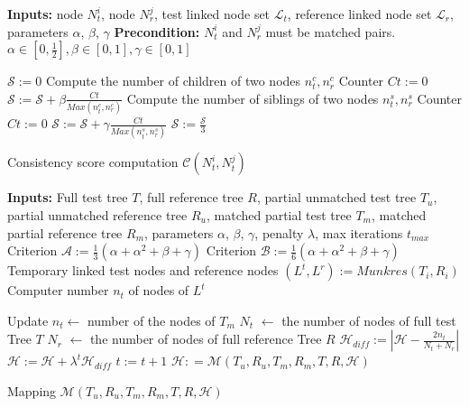 \documentclass[]{article}   %
\begin{document}
\begin{algorithm}[]
	\SetAlgoLined
	\textbf{Inputs:} node $N_t^i$, node $N_r^j$, test linked node set $\mathcal{L}_t$, reference linked node set $\mathcal{L}_r$, parameters $\alpha$, $\beta$, $\gamma$\;
	\textbf{Precondition:} $N_t^i$ and $N_r^j$ must be matched pairs. $\alpha \in [0, \frac{1}{2}],  \beta \in [0,  1], \gamma \in [0, 1]$\;
	
	$\mathcal{S} := 0$ \; 
	Compute the number of children of two nodes $n_t^c, n_r^c$\;
	Counter $Ct := 0$ \;
	$\mathcal{S} := \mathcal{S} + \beta \frac{Ct}{Max(n_t^c, n_r^c)}$\;
	Compute the number of siblings of two nodes $n_t^s, n_r^s$\;
	Counter $Ct := 0$ \;
	$\mathcal{S} := \mathcal{S} + \gamma \frac{Ct}{Max(n_t^s, n_r^s)}$\;
	$\mathcal{S} := \frac{\mathcal{S}}{3}$ \;
	\caption{Consistency score computation $\mathcal{C}(N^i_t,N^j_t)$}
	\label{alg:consistac}
\end{algorithm}

  \begin{algorithm}[]
	\SetAlgoLined
	\textbf{Inputs:} Full test tree $T$, full reference tree $R$, partial unmatched test tree $T_u$, partial unmatched reference tree $R_u$, matched partial test tree $T_m$, matched partial reference tree $R_m$, parameters $\alpha$, $\beta$, $\gamma$,  penalty $\lambda$, max iterations $t_{max}$\;
	Criterion $\mathcal{A} := \frac{1}{3} (\alpha + \alpha^2 + \beta + \gamma)$\;
	Criterion  $\mathcal{B} := \frac{1}{6} (\alpha + \alpha^2 + \beta + \gamma)$\;
	Temporary linked test nodes and reference nodes $(L^t, L^r) := Munkres(T_i, R_i)$ \;
	Computer number $n_t$ of nodes of $L^t$ \;
	
	
	Update $n_t \leftarrow$ number of the nodes of $T_m$ \;
	$N_t$ $\leftarrow$ the number of nodes of full test Tree $T$ \;
	$N_r$ $\leftarrow$ the number of nodes of full reference Tree $R$ \;
	$\mathcal{H}_{diff} := |\mathcal{H} - \frac{2n_t}{N_t+N_r}|$ \;
	$\mathcal{H} := \mathcal{H} + \lambda^t \mathcal{H}_{diff}$\;
	$t := t + 1$\;
	{$\mathcal{H} : =\mathcal{M}(T_u, R_u, T_m, R_m, T,  R, \mathcal{H})$ \;}
	\caption{Mapping $\mathcal{M}(T_u, R_u, T_m, R_m, T,  R, \mathcal{H})$}
	\label{alg:simi-score}
\end{algorithm}



\end{document}
